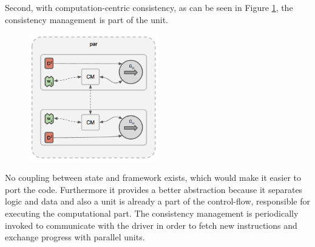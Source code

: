 Second, with computation-centric consistency, as can be seen in Figure \ref{fig:computation_centric_consistency}, the consistency management is part of the unit.
\begin{figure}[ht]
\centering
\includegraphics[width=0.5\textwidth]{img/computation_centric_consist.png}
\caption{}
\label{fig:computation_centric_consistency}
\end{figure}
No coupling between state and framework exists, which would make it easier to port the code.
Furthermore it provides a better abstraction because it separates logic and data and also a unit is already a part of the control-flow, responsible for executing the computational part.
The consistency management is periodically invoked to communicate with the driver in order to fetch new instructions and exchange progress with parallel units.

